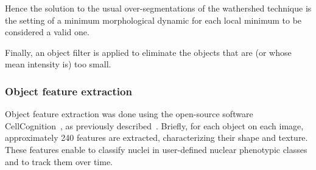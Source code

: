 Hence the solution to the usual over-segmentations of the wathershed technique is the setting of a minimum morphological dynamic for each local minimum to be considered a valid one. 
%

Finally, an object filter is applied to eliminate the objects that are (or whose mean intensity is) too small.

\subsubsection{Object feature extraction}
Object feature extraction was done using the open-source software CellCognition~\cite{cellcognition}, as previously described~\cite{Walter2010}. Briefly, for each object on each image, approximately 240 features are extracted, characterizing their shape and texture. These features enable to classify nuclei in user-defined nuclear phenotypic classes and to track them over time.

